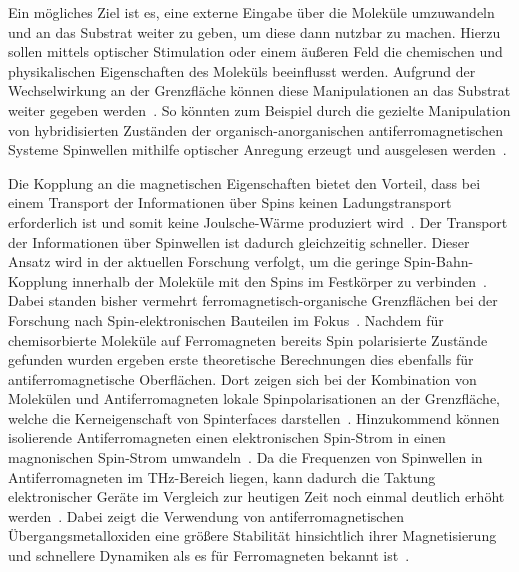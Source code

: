     Ein mögliches Ziel ist es, eine externe Eingabe über die Moleküle umzuwandeln und an das Substrat weiter zu geben, um diese dann nutzbar zu machen.
    Hierzu sollen mittels optischer Stimulation oder einem äußeren Feld die chemischen und physikalischen Eigenschaften des Moleküls beeinflusst werden.
    Aufgrund der Wechselwirkung an der Grenzfläche können diese Manipulationen an das Substrat weiter gegeben werden~\cite{IF_16}.
    So könnten zum Beispiel durch die gezielte Manipulation von hybridisierten Zuständen der organisch-anorganischen antiferromagnetischen Systeme Spinwellen mithilfe optischer Anregung erzeugt und ausgelesen werden~\cite{AFM_2,AFM_1}.

    Die Kopplung an die magnetischen Eigenschaften bietet den Vorteil, dass bei einem Transport der Informationen über Spins keinen Ladungstransport erforderlich ist und somit keine Joulsche-Wärme produziert wird~\cite{AFM_3}.
    Der Transport der Informationen über Spinwellen ist dadurch gleichzeitig schneller.
    Dieser Ansatz wird in der aktuellen Forschung verfolgt, um die geringe Spin-Bahn-Kopplung innerhalb der Moleküle mit den Spins im Festkörper zu verbinden~\cite{xiong_giant_2004}.
    Dabei standen bisher vermehrt ferromagnetisch-organische Grenzflächen bei der Forschung nach Spin-elektronischen Bauteilen im Fokus~\cite{ma-DJ, AFM_5}.
    Nachdem für chemisorbierte Moleküle auf Ferromagneten bereits Spin polarisierte Zustände gefunden wurden \cite{IF_16} ergeben erste theoretische Berechnungen dies ebenfalls für antiferromagnetische Oberflächen.
    Dort zeigen sich bei der Kombination von Molekülen und Antiferromagneten lokale Spinpolarisationen an der Grenzfläche, welche die Kerneigenschaft von Spinterfaces darstellen~\cite{AFM_2}.
    Hinzukommend können isolierende Antiferromagneten einen elektronischen Spin-Strom in einen magnonischen Spin-Strom umwandeln~\cite{AFM_1}.
    Da die Frequenzen von Spinwellen in Antiferromagneten im \si{\tera\hertz}-Bereich liegen, kann dadurch die Taktung elektronischer Geräte im Vergleich zur heutigen Zeit noch einmal deutlich erhöht werden~\cite{AFM_5}.
    Dabei zeigt die Verwendung von antiferromagnetischen Übergangsmetalloxiden eine größere Stabilität hinsichtlich ihrer Magnetisierung und schnellere Dynamiken als es für Ferromagneten bekannt ist~\cite{AFM_1}.
    


